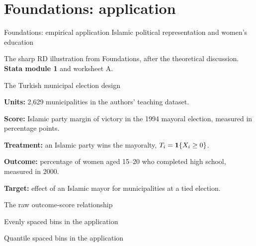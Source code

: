 \section{Foundations: application}
\begin{frame}[plain]{Foundations: empirical application}
\Large Islamic political representation and women's education\par
\vspace{1em}\normalsize
The sharp RD illustration from Foundations, after the theoretical discussion.\\[1em]
\textbf{Stata module 1} and worksheet A.
\end{frame}

\begin{frame}{The Turkish municipal election design}
\begin{items}
\item \textbf{Units:} 2,629 municipalities in the authors' teaching dataset.
\item \textbf{Score:} Islamic party margin of victory in the 1994 mayoral election, measured in percentage points.
\item \textbf{Treatment:} an Islamic party wins the mayoralty, $T_i=\mathbf{1}\{X_i\geq0\}$.
\item \textbf{Outcome:} percentage of women aged 15--20 who completed high school, measured in 2000.
\item \textbf{Target:} effect of an Islamic mayor for municipalities at a tied election.
\end{items}
\end{frame}

\begin{frame}{The raw outcome-score relationship}
\end{frame}

\begin{frame}{Evenly spaced bins in the application}
\end{frame}

\begin{frame}{Quantile spaced bins in the application}
\end{frame}

